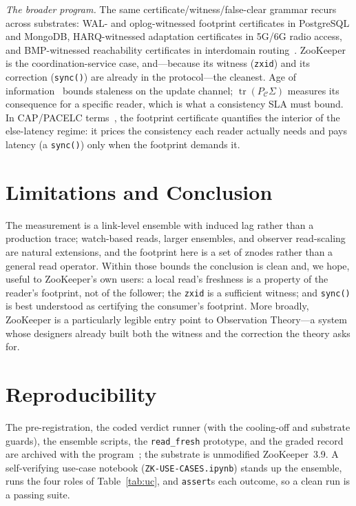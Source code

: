 \documentclass[conference]{IEEEtran}
\newcommand{\PC}{P_{\mathcal{C}}}
\newcommand{\tr}{\operatorname{tr}}
\begin{document}
\emph{The broader program.} The same certificate/witness/false-clear grammar
recurs across substrates: WAL- and oplog-witnessed footprint certificates in
PostgreSQL and MongoDB, HARQ-witnessed adaptation certificates in 5G/6G radio
access, and BMP-witnessed reachability certificates in interdomain
routing~\cite{bond_ot}. ZooKeeper is the coordination-service case, and---because
its witness (\texttt{zxid}) and its correction (\texttt{sync()}) are already in
the protocol---the cleanest. Age of information~\cite{kaul2012aoi} bounds
staleness on the update channel; $\tr(\PC\Sigma)$ measures its consequence for a
specific reader, which is what a consistency SLA must bound. In CAP/PACELC
terms~\cite{gilbert2002cap,abadi2012pacelc}, the footprint certificate quantifies
the interior of the else-latency regime: it prices the consistency each reader
actually needs and pays latency (a \texttt{sync()}) only when the footprint
demands it.

\section{Limitations and Conclusion}
The measurement is a link-level ensemble with induced lag rather than a production
trace; watch-based reads, larger ensembles, and observer read-scaling are natural
extensions, and the footprint here is a set of znodes rather than a general read
operator. Within those bounds the conclusion is clean and, we hope, useful to
ZooKeeper's own users: a local read's freshness is a property of the reader's
footprint, not of the follower; the \texttt{zxid} is a sufficient witness; and
\texttt{sync()} is best understood as certifying the consumer's footprint. More
broadly, ZooKeeper is a particularly legible entry point to Observation
Theory---a system whose designers already built both the witness and the
correction the theory asks for.

\section*{Reproducibility}
The pre-registration, the coded verdict runner (with the cooling-off and
substrate guards), the ensemble scripts, the \texttt{read\_fresh} prototype, and
the graded record are archived with the program~\cite{bond_prereg}; the substrate
is unmodified ZooKeeper~3.9. A self-verifying use-case notebook
(\texttt{ZK-USE-CASES.ipynb}) stands up the ensemble, runs the four roles of
Table~\ref{tab:uc}, and \texttt{assert}s each outcome, so a clean run is a
passing suite.



\end{document}
